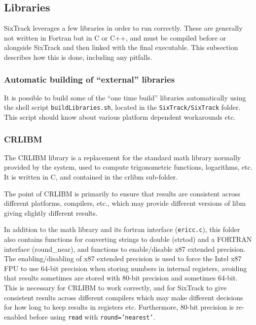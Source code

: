 \documentclass[english,BCOR=0mm,DIV=18]{scrartcl}
\begin{document}
\subsection{Libraries}
SixTrack leverages a few libraries in order to run correctly.
These are generally not written in Fortran but in C or C++, and must be compiled before or alongside SixTrack and then linked with the final executable.
This subsection describes how this is done, including any pitfalls.

\subsubsection{Automatic building of ``external'' libraries}
\label{sec:building:libs:automatic}

It is possible to build some of the ``one time build'' libraries automatically using the shell script \texttt{buildLibraries.sh}, located in the \texttt{SixTrack/SixTrack} folder.
This script should know about various platform dependent workarounds etc.

\subsubsection{CRLIBM}
\label{sec:building:libs:crlibm}
The CRLIBM library  is a replacement for the standard math library normally provided by the system, used to compute trigonometric functions, logarithms, etc.
It is written in C, and contained in the \textrm{crlibm} sub-folder.

The point of CRLIBM is primarily to ensure that results are consistent across different platforms, compilers, etc., which may provide different versions of libm giving slightly different results.

In addition to the math library and its fortran interface (\texttt{ericc.c}), this folder also contains functions for converting strings to double (\textrm{strtod}) and a FORTRAN interface (\textrm{round\_near}), and functions to enable/disable x87 extended precision.
The enabling/disabling of x87 extended precision is used to force the Intel x87 FPU to use 64-bit precision when storing numbers in internal registers, avoiding that results sometimes are stored with 80-bit precision and sometimes 64-bit.
This is necessary for CRLIBM to work correctly, and for SixTrack to give consistent results across different compilers which may make different decisions for how long to keep results in registers etc.
Furthermore, 80-bit precision is re-enabled before using \texttt{read} with \texttt{round='nearest'}.
\end{document}

